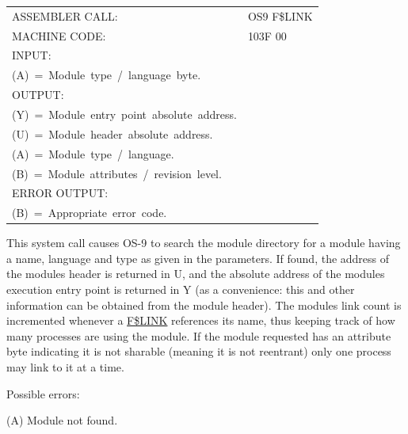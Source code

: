 \documentclass[
]{article}
\newcounter{none} %
\begin{document}
{\def\LTcaptype{none} %
\begin{longtable}[]{@{}
  >{\raggedright\arraybackslash}p{}
  >{\raggedright\arraybackslash}p{}@{}}
\toprule\noalign{}
\endhead
\bottomrule\noalign{}
\endlastfoot
ASSEMBLER CALL: & OS9 F\$LINK \\
MACHINE CODE: & 103F 00 \\
INPUT: & \begin{minipage}[t]{\linewidth}\raggedright
(X)~=~Address~of~the~module~name~string.\\
(A)~=~Module~type~/~language~byte.
\end{minipage} \\
OUTPUT: & \begin{minipage}[t]{\linewidth}\raggedright
(X)~=~Advanced~past~the~module~name.\\
(Y)~=~Module~entry~point~absolute~address.\\
(U)~=~Module~header~absolute~address.\\
(A)~=~Module~type~/~language.\\
(B)~=~Module~attributes~/~revision~level.
\end{minipage} \\
ERROR OUTPUT: & \begin{minipage}[t]{\linewidth}\raggedright
(CC)~=~C~bit~set.\\
(B)~=~Appropriate~error~code.
\end{minipage} \\
\end{longtable}
}

This system call causes OS-9 to search the module directory for a module
having a name, language and type as given in the parameters. If found,
the address of the module\textquotesingle s header is returned in U, and
the absolute address of the module\textquotesingle s execution entry
point is returned in Y (as a convenience: this and other information can
be obtained from the module header). The module\textquotesingle s link
count\textquotesingle{} is incremented whenever a
\hyperref[f.link]{F\$LINK} references its name, thus keeping track of
how many processes are using the module. If the module requested has an
attribute byte indicating it is not sharable (meaning it is not
reentrant) only one process may link to it at a time.

Possible errors:

(A) Module not found.
\end{document}
